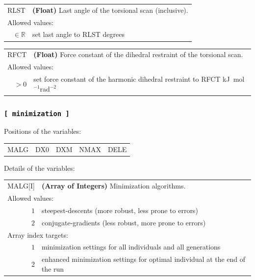 \documentclass[10pt,a4paper,openany]{memoir}
\numberwithin{equation}{section}
\begin{document}
{
\begin{tabular}{r@{ : }l}
\label{descr:rlst}
      RLST&\textbf{(Float)} Last angle of the torsional scan (inclusive).                                                        \\ 
\multicolumn{2}{l}{Allowed values:} \\ 
\(\in\mathbb{R}\)&set last angle to RLST degrees                                                                       \\ 
\end{tabular}
\vspace{1ex}
}

{
\begin{tabular}{r@{ : }l}
\label{descr:rfct}
      RFCT&\textbf{(Float)} Force constant of the dihedral restraint of the torsional scan.                                      \\ 
\multicolumn{2}{l}{Allowed values:} \\ 
    \(>0\)&set force constant of the harmonic dihedral restraint to RFCT kJ~mol$^{-1}$rad$^{-2}$                \\ 
\end{tabular}
\vspace{1ex}
}

\subsubsection{\texttt{[~minimization~]}}
\label{sec:inp-minimization}


\noindent Positions of the variables:
\begin{center}
  \begin{tabular}{lllll}
    MALG & DX0 & DXM & NMAX & DELE \\
  \end{tabular}
\end{center}

\noindent Details of the variables:
\vspace{2ex}

{
\begin{tabular}{r@{ : }l}
\label{descr:malg}
      MALG[I]&\textbf{(Array of Integers)} Minimization algorithms.                                                                             \\ 
\multicolumn{2}{l}{Allowed values:} \\ 
     \(1\)&steepest-descents (more robust, less prone to errors)                                                                                    \\ 
     \(2\)&conjugate-gradients (less robust, more prone to errors)                                                                                  \\ 
\multicolumn{2}{l}{Array index targets:} \\ 
     \(1\)&minimization settings for all individuals and all generations \\
     \(2\)&enhanced minimization settings for optimal individual at the end of the run \\
\end{tabular}
\vspace{1ex}
}
\end{document}

